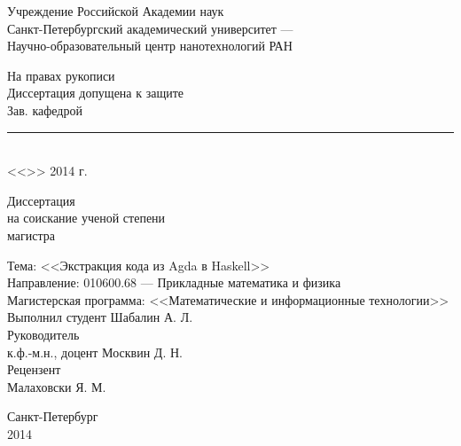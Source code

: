 \begin{titlepage}

\begin{center}
Учреждение Российской Академии наук\\
Санкт-Петербургский академический университет ---\\
Научно-образовательный центр нанотехнологий РАН
\end{center}

\vspace{1cm}

\begin{flushright}
\begin{minipage}{0.5\textwidth}
\begin{center}
На правах рукописи\\[.5cm]
Диссертация допущена к защите\\
Зав. кафедрой\\[.3cm]
\rule{7cm}{.5pt}\\
<<\hspace{.8cm}>> \underline{\hspace{3.5cm}} 2014 г.\\
\end{center}
\end{minipage}
\end{flushright}

\vspace{1cm}

\begin{center}
Диссертация\\
на соискание ученой степени\\
магистра
\end{center}

\begin{flushleft}
Тема: <<Экстракция кода из Agda в Haskell>>\\[.5cm]

Направление: 010600.68 --- Прикладные математика и физика\\[.5cm]

Магистерская программа: <<Математические и информационные технологии>>\\[1cm]

Выполнил студент \hfill Шабалин А. Л.\\[.5cm]

Руководитель\\
к.ф.-м.н., доцент \hfill Москвин Д. Н.\\[.5cm]

Рецензент\\
\hfill Малаховски Я. М.
\end{flushleft}

\vfill

\begin{center}
Санкт-Петербург\\
2014
\end{center}

\end{titlepage}
